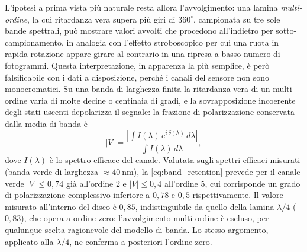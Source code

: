 L'ipotesi a prima vista più naturale resta allora l'avvolgimento: una lamina \emph{multi-ordine}, la cui ritardanza vera supera più giri di $360^\circ$, campionata su tre sole bande spettrali, può mostrare valori avvolti che procedono all'indietro per sotto-campionamento, in analogia con l'effetto stroboscopico per cui una ruota in rapida rotazione appare girare al contrario in una ripresa a basso numero di fotogrammi. Questa interpretazione, in apparenza la più semplice, è però falsificabile con i dati a disposizione, perché i canali del sensore non sono monocromatici. Su una banda di larghezza finita la ritardanza vera di un multi-ordine varia di molte decine o centinaia di gradi, e la sovrapposizione incoerente degli stati uscenti depolarizza il segnale: la frazione di polarizzazione conservata dalla media di banda è
\begin{equation}
    |V| = \frac{\left|\int I(\lambda)\, e^{i\,\delta(\lambda)}\, d\lambda\right|}{\int I(\lambda)\, d\lambda},
    \label{eq:band_retention}
\end{equation}
dove $I(\lambda)$ è lo spettro efficace del canale. Valutata sugli spettri efficaci misurati (banda verde di larghezza $\approx \SI{40}{\nano\meter}$), la \cref{eq:band_retention} prevede per il canale verde $|V| \leq 0{,}74$ già all'ordine $2$ e $|V| \leq 0{,}4$ all'ordine $5$, cui corrisponde un grado di polarizzazione complessivo inferiore a $0{,}78$ e $0{,}5$ rispettivamente. Il valore misurato all'interno del disco è $0{,}85$, indistinguibile da quello della lamina $\lambda/4$ ($0{,}83$), che opera a ordine zero: l'avvolgimento multi-ordine è escluso, per qualunque scelta ragionevole del modello di banda. Lo stesso argomento, applicato alla $\lambda/4$, ne conferma a posteriori l'ordine zero.

